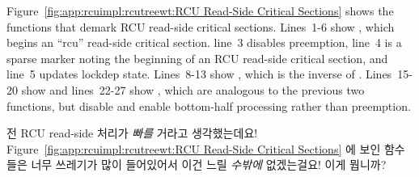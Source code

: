 Figure~\ref{fig:app:rcuimpl:rcutreewt:RCU Read-Side Critical Sections}
shows the functions that demark RCU read-side critical sections.
Lines~1-6 show , which begins an ``rcu''
read-side critical section.
line~3 disables preemption,
line~4 is a sparse marker noting the beginning of an RCU read-side critical
section,
and
line~5 updates lockdep state.
Lines~8-13 show , which is the inverse of
.
Lines~15-20 show  and lines~22-27 show
, which are analogous to the previous
two functions, but disable and enable bottom-half processing rather
than preemption.
\fi

\QuickQuiz{}
	전 RCU read-side 처리가 \emph{빠를} 거라고 생각했는데요!
	Figure~\ref{fig:app:rcuimpl:rcutreewt:RCU Read-Side Critical Sections}
	에 보인 함수들은 너무 쓰레기가 많이 들어있어서 이건 느릴 \emph{수밖에}
	없겠는걸요!
	이게 뭡니까?
	\iffalse


